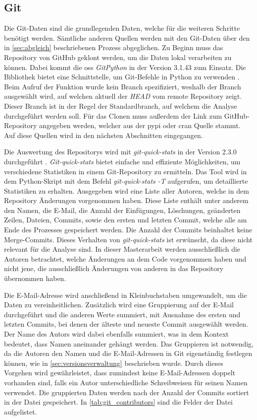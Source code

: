 \subsection{Git}
\label{subsec:datenbeschaffung_git}
Die Git-Daten sind die grundlegenden Daten, welche für die weiteren Schritte benötigt werden.
Sämtliche anderen Quellen werden mit den Git-Daten über den in \autoref{sec:abgleich} beschriebenen Prozess abgeglichen.
Zu Beginn muss das Repository von GitHub geklont werden, um die Daten lokal verarbeiten zu können.
Dabei kommt die \gls{oss} \emph{GitPython} in der Version 3.1.43 zum Einsatz.
Die Bibliothek bietet eine Schnittstelle, um Git-Befehle in Python zu verwenden \autocite{thiel_gitpython_2024}.
Beim Aufruf der Funktion wurde kein Branch spezifiziert, weshalb der Branch ausgewählt wird, auf welchen aktuell der \emph{HEAD} vom remote Repository zeigt.
Dieser Branch ist in der Regel der Standardbranch, auf welchem die Analyse durchgeführt werden soll.
Für das Clonen muss außerdem der Link zum GitHub-Repository angegeben werden, welcher aus der \gls{pypi} oder \gls{cran} Quelle stammt.
Auf diese Quellen wird in den nächsten Abschnitten eingegangen.

Die Auswertung des Repositorys wird mit \emph{git-quick-stats} in der Version 2.3.0 durchgeführt \autocite{arzzen_git-quick-stats_2021}.
\emph{Git-quick-stats} bietet einfache und effiziente Möglichkeiten, um verschiedene Statistiken in einem Git-Repository zu ermitteln.
Das Tool wird in dem Python-Skript mit dem Befehl \emph{git-quick-stats -T} aufgerufen, um detaillierte Statistiken zu erhalten.
Ausgegeben wird eine Liste aller Autoren, welche in dem Repository Änderungen vorgenommen haben.
Diese Liste enthält unter anderem den Namen, die E-Mail, die Anzahl der Einfügungen, Löschungen, geänderten Zeilen, Dateien, Commits, sowie den ersten und letzten Commit, welche alle am Ende des Prozesses gespeichert werden.
Die Anzahl der Commits beinhaltet keine Merge-Commits.
Dieses Verhalten von \emph{git-quick-stats} ist erwünscht, da diese nicht relevant für die Analyse sind.
In dieser Masterarbeit werden ausschließlich die Autoren betrachtet, welche Änderungen an dem Code vorgenommen haben und nicht jene, die ausschließlich Änderungen von anderen in das Repository übernommen haben.

Die E-Mail-Adresse wird anschließend in Kleinbuchstaben umgewandelt, um die Daten zu vereinheitlichen.
Zusätzlich wird eine Gruppierung auf der E-Mail durchgeführt und die anderen Werte summiert, mit Ausnahme des ersten und letzten Commits, bei denen der älteste und neueste Commit ausgewählt werden.
Der Name des Autors wird dabei ebenfalls summiert, was in dem Kontext bedeutet, dass Namen aneinander gehängt werden.
Das Gruppieren ist notwendig, da die Autoren den Namen und die E-Mail-Adressen in Git eigenständig festlegen können, wie in \autoref{sec:versionsverwaltung} beschrieben wurde.
Durch dieses Vorgehen wird gewährleistet, dass zumindest keine E-Mail-Adressen doppelt vorhanden sind, falls ein Autor unterschiedliche Schreibweisen für seinen Namen verwendet.
Die gruppierten Daten werden nach der Anzahl der Commits sortiert in der Datei  gespeichert.
In \autoref{tab:git_contributors} sind die Felder der Datei aufgelistet.

